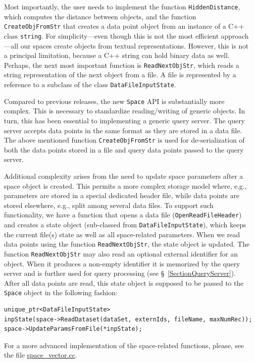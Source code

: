 \documentclass[runningheads,a4paper]{llncs}
\newcommand{\replocfile}{https://github.com/searchivarius/NonMetricSpaceLib/blob/pserv/}
\newcommand{\ttt}[1]{\texttt{#1}}
\begin{document}
Most importantly, the user needs to implement the function \ttt{HiddenDistance},
which computes the distance between objects,
and the function \ttt{CreateObjFromStr} that creates a data point object from an instance
of a C++ class \ttt{string}.
For simplicity---even though this is not the most efficient approach---all our spaces create
objects from textual representations. However, this is not a principal limitation,
because a C++ string can hold binary data as well.
Perhaps, the next most important function is \ttt{ReadNextObjStr}, 
which reads a string representation of the next object from a file. 
A file is represented by a reference to a subclass of the class \ttt{DataFileInputState}.

Compared to previous releases, the new \ttt{Space} API is substantially more complex.
This is necessary to standardize reading/writing of generic objects.
In turn, this has been essential to implementing a generic query server.
The query server accepts data points in the same format as they are stored in a data file.
The above mentioned function \ttt{CreateObjFromStr} is used for de-serialization
of both the data points stored in a file and query data points passed to the query server. 

Additional complexity arises from the need to update space parameters after a space object is created.  
This permits a more complex storage model where, e.g., parameters are stored
in a special dedicated header file, while data points are stored elsewhere,
e.g., split among several data files. 
To support such functionality, we have a function that opens a data file (\ttt{OpenReadFileHeader})
and creates a state object (sub-classed from \ttt{DataFileInputState}),
which keeps the current file(s) state as well as all space-related parameters. 
When we read data points using the function \ttt{ReadNextObjStr}, 
the state object is updated.
The function \ttt{ReadNextObjStr} may also read an optional external identifier for an object.
When it produces a non-empty identifier it is memorized by the query server and is further
used for query processing (see \S~\ref{SectionQueryServer}).
After all data points are read, this state object is supposed to be passed to the \ttt{Space} object
in the following fashion:
\begin{verbatim}
unique_ptr<DataFileInputState> 
inpState(space->ReadDataset(dataSet, externIds, fileName, maxNumRec));
space->UpdateParamsFromFile(*inpState);
\end{verbatim}
For a more advanced implementation of the space-related functions,
please, see the file
\href{\replocfile similarity_search/src/space/space_vector.cc}{space\_vector.cc}.
\end{document}
